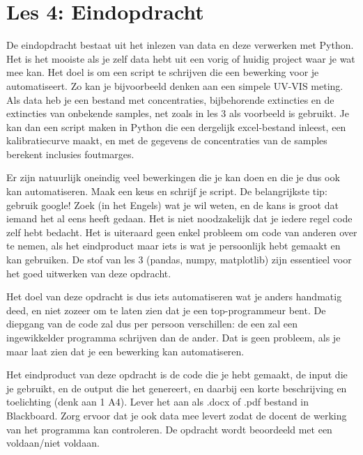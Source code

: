 \chapter{Les 4: Eindopdracht}

De eindopdracht bestaat uit het inlezen van data en deze verwerken met Python. Het is het mooiste als je zelf data hebt uit een vorig of huidig project waar je wat mee kan. Het doel is om een script te schrijven die een bewerking voor je automatiseert. Zo kan je bijvoorbeeld denken aan een simpele UV-VIS meting. Als data heb je een bestand met concentraties, bijbehorende extincties en de extincties van onbekende samples, net zoals in les 3 als voorbeeld is gebruikt. Je kan dan een script maken in Python die een dergelijk excel-bestand inleest, een kalibratiecurve maakt, en met de gegevens de concentraties van de samples berekent inclusies foutmarges. 

Er zijn natuurlijk oneindig veel bewerkingen die je kan doen en die je dus ook kan automatiseren. Maak een keus en schrijf je script. De belangrijkste tip: gebruik google! Zoek (in het Engels) wat je wil weten, en de kans is groot dat iemand het al eens heeft gedaan. Het is niet noodzakelijk dat je iedere regel code zelf hebt bedacht. Het is uiteraard geen enkel probleem om code van anderen over te nemen, als het eindproduct maar iets is wat je persoonlijk hebt gemaakt en kan gebruiken. 
De stof van les 3 (pandas, numpy, matplotlib) zijn essentieel voor het goed uitwerken van deze opdracht.

Het doel van deze opdracht is dus iets automatiseren wat je anders handmatig deed, en niet zozeer om te laten zien dat je een top-programmeur bent. De diepgang van de code zal dus per persoon verschillen: de een zal een ingewikkelder programma schrijven dan de ander. Dat is geen probleem, als je maar laat zien dat je een bewerking kan automatiseren.

Het eindproduct van deze opdracht is de code die je hebt gemaakt, de input die je gebruikt, en de output die het genereert, en daarbij een korte beschrijving en toelichting (denk aan 1 A4). Lever het aan als .docx of .pdf bestand in Blackboard. Zorg ervoor dat je ook data mee levert zodat de docent de werking van het programma kan controleren.  De opdracht wordt beoordeeld met een voldaan/niet voldaan. 